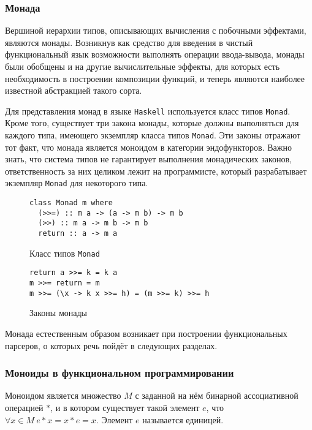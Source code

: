 \subsubsection{Монада}

Вершиной иерархии типов, описывающих вычисления с побочными эффектами, являются монады. Возникнув как средство для введения в чистый функциональный язык возможности выполнять операции ввода-вывода, монады были обобщены и на другие вычислительные эффекты, для которых есть необходимость в построении композиции функций, и теперь являются наиболее известной абстракцией такого сорта.

Для представления монад в языке \lstinline{Haskell} используется класс типов \lstinline{Monad}. Кроме того, существует три закона монады, которые должны выполняться для каждого типа, имеющего экземпляр класса типов \lstinline{Monad}. Эти законы отражают тот факт, что монада является моноидом в категории эндофункторов. Важно знать, что система типов не гарантирует выполнения монадических законов, ответственность за них целиком лежит на программисте, который разрабатывает экземпляр \lstinline{Monad} для некоторого типа.

\begin{figure}[h]
\begin{lstlisting}
class Monad m where
  (>>=) :: m a -> (a -> m b) -> m b
  (>>) :: m a -> m b -> m b
  return :: a -> m a
\end{lstlisting}
\caption{Класс типов \lstinline{Monad}}
\label{listing:Monad}
\end{figure}

\begin{figure}[h]
\begin{lstlisting}
return a >>= k = k a
m >>= return = m
m >>= (\x -> k x >>= h) = (m >>= k) >>= h
\end{lstlisting}
\caption{Законы монады}
\label{listing:MonadLaws}
\end{figure}

Монада естественным образом возникает при построении функциональных парсеров, о которых речь пойдёт в следующих разделах.

\subsubsection{Моноиды в функциональном программировании}

Моноидом является множество $M$ с заданной на нём бинарной ассоциативной операцией $*$, и в котором существует такой элемент $e$, что $\forall x \in M~e*x = x*e = x$. Элемент $e$ называется единицей.

